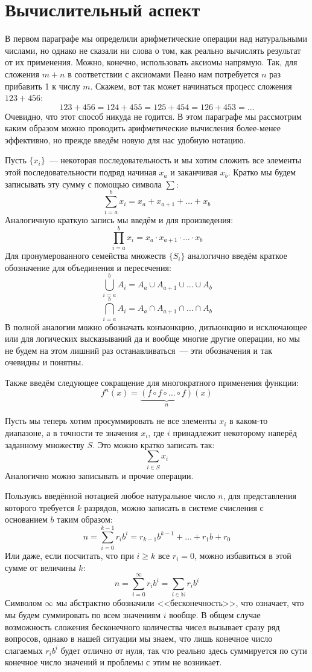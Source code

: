 \section{Вычислительный аспект}

В первом параграфе мы определили арифметические операции над натуральными числами, но однако не сказали ни слова о том, как реально вычислять результат от их применения. Можно, конечно, использовать аксиомы напрямую. Так, для сложения $m+n$ в соответствии с аксиомами Пеано нам потребуется $n$ раз прибавить 1 к числу $m$. Скажем, вот так может начинаться процесс сложения $123+456$:
$$123+456 = 124 + 455 = 125 + 454 = 126 + 453 = \ldots$$
Очевидно, что этот способ никуда не годится. В этом параграфе мы рассмотрим каким образом можно проводить арифметические вычисления более-менее эффективно, но прежде введём новую для нас удобную нотацию.

Пусть $\{x_i\}$~--- некоторая последовательность и мы хотим сложить все элементы этой последовательности подряд начиная $x_a$ и заканчивая $x_b$. Кратко мы будем записывать эту сумму с помощью символа $\sum$:
$$\sum_{i=a}^b x_i = x_a + x_{a+1} + \ldots + x_b$$
Аналогичную краткую запись мы введём и для произведения:
$$\prod_{i=a}^b x_i = x_a \cdot x_{a+1} \cdot \ldots \cdot x_b$$
Для пронумерованного семейства множеств $\{S_i\}$ аналогично введём краткое обозначение для объединения и пересечения:
$$\bigcup_{i=a}^b A_i = A_a \cup A_{a+1}\cup\ldots\cup A_b$$
$$\bigcap_{i=a}^b A_i = A_a \cap A_{a+1}\cap\ldots\cap A_b$$
В полной аналогии можно обозначать конъюнкцию, дизъюнкцию и исключающее или  для логических высказываний да и вообще многие другие операции, но мы не будем на этом лишний раз останавливаться~--- эти обозначения и так очевидны и понятны.

Также введём следующее сокращение для многократного применения функции:
$$f^n(x) = \underbrace{(f\circ f\circ\ldots\circ f)}_n (x)$$

Пусть мы теперь хотим просуммировать не все элементы $x_i$ в каком-то диапазоне, а в точности те значения $x_i$, где $i$ принадлежит некоторому наперёд заданному множеству $S$. Это можно кратко записать так:
$$\sum_{i\in S} x_i$$
Аналогично можно записывать и прочие операции.

Пользуясь введённой нотацией любое натуральное число $n$, для представления которого требуется $k$ разрядов, можно записать в системе счисления с основанием $b$ таким образом:
$$n = \sum_{i=0}^{k-1} r_i b^i = r_{k - 1} b^{k-1} + \ldots + r_1 b + r_0$$
Или даже, если посчитать, что при $i\ge k$ все $r_i = 0$, можно избавиться в этой сумме от величины $k$:
$$n = \sum_{i=0}^\infty r_i b^i = \sum_{i\in\mathbb{N}} r_i b^i$$
Символом $\infty$ мы абстрактно обозначили <<бесконечность>>, что означает, что мы будем суммировать по всем значениям $i$ вообще. В общем случае возможность сложения бесконечного количества чисел вызывает сразу ряд вопросов, однако в нашей ситуации мы знаем, что лишь конечное число слагаемых $r_ib^i$ будет отлично от нуля, так что реально здесь суммируется по сути конечное число значений и проблемы с этим не возникает.

